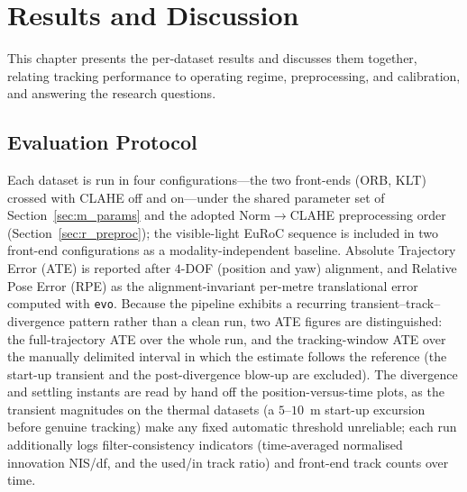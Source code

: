 \chapter{Results and Discussion}
\label{ch:results_and_discussion}

This chapter presents the per-dataset results and discusses them together, relating tracking performance to operating regime, preprocessing, and calibration, and answering the research questions.

\section{Evaluation Protocol}
\label{sec:r_protocol}
Each dataset is run in four configurations---the two front-ends (ORB, KLT) crossed with CLAHE off and on---under the shared parameter set of Section~\ref{sec:m_params} and the adopted Norm$\rightarrow$CLAHE preprocessing order (Section~\ref{sec:r_preproc}); the visible-light EuRoC sequence is included in two front-end configurations as a modality-independent baseline. Absolute Trajectory Error (ATE) is reported after $4$-DOF (position and yaw) alignment, and Relative Pose Error (RPE) as the alignment-invariant per-metre translational error computed with \texttt{evo}. Because the pipeline exhibits a recurring transient--track--divergence pattern rather than a clean run, two ATE figures are distinguished: the full-trajectory ATE over the whole run, and the tracking-window ATE over the manually delimited interval in which the estimate follows the reference (the start-up transient and the post-divergence blow-up are excluded). The divergence and settling instants are read by hand off the position-versus-time plots, as the transient magnitudes on the thermal datasets (a $5$--$10$~m start-up excursion before genuine tracking) make any fixed automatic threshold unreliable; each run additionally logs filter-consistency indicators (time-averaged normalised innovation NIS/df, and the used/in track ratio) and front-end track counts over time.

